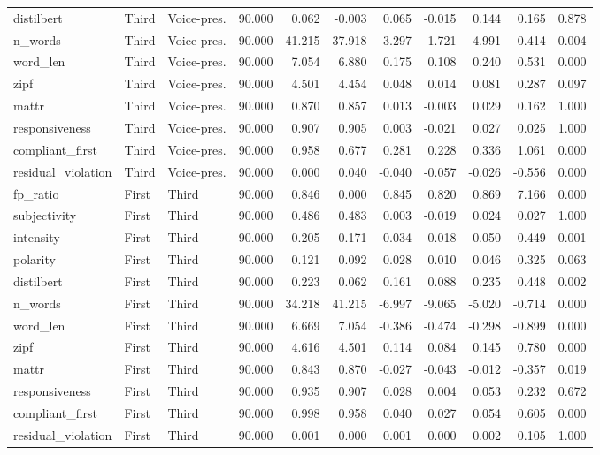 \documentclass[10pt]{article}
\begin{document}
{\begin{longtable}{lllrrrrrrrr}
distilbert & Third & Voice-pres. & 90.000 & 0.062 & -0.003 & 0.065 & -0.015 & 0.144 & 0.165 & 0.878 \\
n\_words & Third & Voice-pres. & 90.000 & 41.215 & 37.918 & 3.297 & 1.721 & 4.991 & 0.414 & 0.004 \\
word\_len & Third & Voice-pres. & 90.000 & 7.054 & 6.880 & 0.175 & 0.108 & 0.240 & 0.531 & 0.000 \\
zipf & Third & Voice-pres. & 90.000 & 4.501 & 4.454 & 0.048 & 0.014 & 0.081 & 0.287 & 0.097 \\
mattr & Third & Voice-pres. & 90.000 & 0.870 & 0.857 & 0.013 & -0.003 & 0.029 & 0.162 & 1.000 \\
responsiveness & Third & Voice-pres. & 90.000 & 0.907 & 0.905 & 0.003 & -0.021 & 0.027 & 0.025 & 1.000 \\
compliant\_first & Third & Voice-pres. & 90.000 & 0.958 & 0.677 & 0.281 & 0.228 & 0.336 & 1.061 & 0.000 \\
residual\_violation & Third & Voice-pres. & 90.000 & 0.000 & 0.040 & -0.040 & -0.057 & -0.026 & -0.556 & 0.000 \\
fp\_ratio & First & Third & 90.000 & 0.846 & 0.000 & 0.845 & 0.820 & 0.869 & 7.166 & 0.000 \\
subjectivity & First & Third & 90.000 & 0.486 & 0.483 & 0.003 & -0.019 & 0.024 & 0.027 & 1.000 \\
intensity & First & Third & 90.000 & 0.205 & 0.171 & 0.034 & 0.018 & 0.050 & 0.449 & 0.001 \\
polarity & First & Third & 90.000 & 0.121 & 0.092 & 0.028 & 0.010 & 0.046 & 0.325 & 0.063 \\
distilbert & First & Third & 90.000 & 0.223 & 0.062 & 0.161 & 0.088 & 0.235 & 0.448 & 0.002 \\
n\_words & First & Third & 90.000 & 34.218 & 41.215 & -6.997 & -9.065 & -5.020 & -0.714 & 0.000 \\
word\_len & First & Third & 90.000 & 6.669 & 7.054 & -0.386 & -0.474 & -0.298 & -0.899 & 0.000 \\
zipf & First & Third & 90.000 & 4.616 & 4.501 & 0.114 & 0.084 & 0.145 & 0.780 & 0.000 \\
mattr & First & Third & 90.000 & 0.843 & 0.870 & -0.027 & -0.043 & -0.012 & -0.357 & 0.019 \\
responsiveness & First & Third & 90.000 & 0.935 & 0.907 & 0.028 & 0.004 & 0.053 & 0.232 & 0.672 \\
compliant\_first & First & Third & 90.000 & 0.998 & 0.958 & 0.040 & 0.027 & 0.054 & 0.605 & 0.000 \\
residual\_violation & First & Third & 90.000 & 0.001 & 0.000 & 0.001 & 0.000 & 0.002 & 0.105 & 1.000 \\
\bottomrule
\end{longtable}
}
\end{document}
